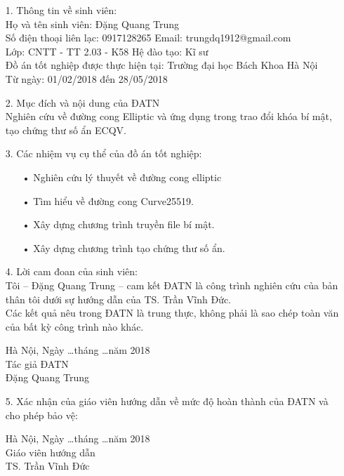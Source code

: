 \documentclass[a4paper,12pt]{report}
\begin{document}
\begin{itemize}
\item[1. ] Thông tin về sinh viên: \\[3pt]
Họ và tên sinh viên: Đặng Quang Trung \\[3pt]
Số điện thoại liên lạc: 0917128265 \hspace*{2.5cm} Email: trungdq1912@gmail.com \\[3pt]
Lớp: CNTT - TT 2.03 - K58 \hspace*{3.45cm} Hệ đào tạo: Kĩ sư \\ [3pt]
Đồ án tốt nghiệp được thực hiện tại: Trường đại học Bách Khoa Hà Nội \\ [3pt]
Từ ngày: 01/02/2018 đến 28/05/2018
\item[2. ] Mục đích và nội dung của ĐATN \\ [3pt]
Nghiên cứu về đường cong Elliptic và ứng dụng trong trao đổi khóa bí mật, tạo chứng thư số ẩn ECQV.
\item[3. ] Các nhiệm vụ cụ thể của đồ án tốt nghiệp:
\begin{itemize}
\item[•] Nghiên cứu lý thuyết về đường cong elliptic
\item[•] Tìm hiểu về đường cong Curve25519.
\item[•] Xây dựng chương trình truyền file bí mật.
\item[•] Xây dựng chương trình tạo chứng thư số ẩn.
\end{itemize}
\item[4. ] Lời cam đoan của sinh viên: \\[3pt]
Tôi – Đặng Quang Trung – cam kết ĐATN là công trình nghiên cứu của bản thân tôi dưới sự hướng dẫn của TS. Trần Vĩnh Đức. \\[6pt]
Các kết quả nêu trong ĐATN là trung thực, không phải là sao chép toàn văn của bất kỳ công trình nào khác.
\begin{flushright}
\begin{minipage}[t]{7cm}
\begin{center}
Hà Nội, Ngày \ldots tháng \ldots năm 2018 \\
Tác giả ĐATN \\[50pt]
Đặng Quang Trung
\end{center}
\end{minipage}
\end{flushright}
\item[5. ] Xác nhận của giáo viên hướng dẫn về mức độ hoàn thành của ĐATN và cho phép bảo vệ:
\begin{flushright}
\begin{minipage}[t]{7cm}
\begin{center}
Hà Nội, Ngày \ldots tháng \ldots năm 2018 \\
Giáo viên hướng dẫn \\[55pt]
TS. Trần Vĩnh Đức
\end{center}
\end{minipage}
\end{flushright}
\end{itemize}
\end{document}
